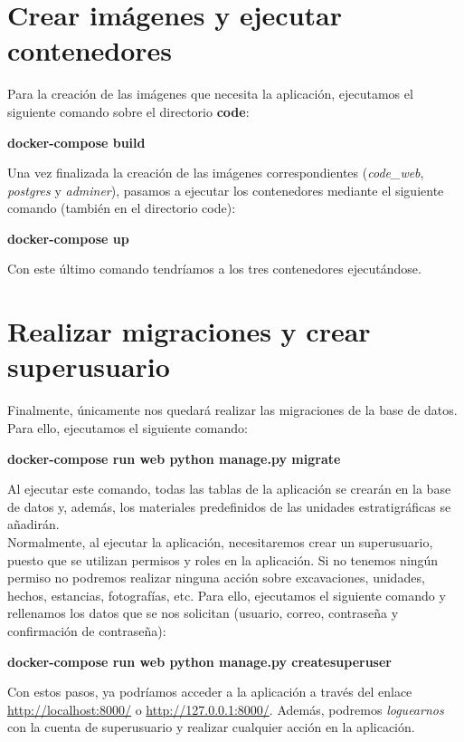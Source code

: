 \section{Crear imágenes y ejecutar contenedores}
Para la creación de las imágenes que necesita la aplicación, ejecutamos el siguiente comando
sobre el directorio \textbf{code}:

\begin{center}
    \textbf{docker-compose build}
\end{center}

Una vez finalizada la creación de las imágenes correspondientes (\textit{code\_web},
\textit{postgres} y \textit{adminer}), pasamos a ejecutar los contenedores mediante
el siguiente comando (también en el directorio code):

\begin{center}
    \textbf{docker-compose up}
\end{center}

Con este último comando tendríamos a los tres contenedores ejecutándose.

\section{Realizar migraciones y crear superusuario}
Finalmente, únicamente nos quedará realizar las migraciones de la base de datos. Para
ello, ejecutamos el siguiente comando:

\begin{center}
    \textbf{docker-compose run web python manage.py migrate}
\end{center}

Al ejecutar este comando, todas las tablas de la aplicación se crearán en la base de datos
y, además, los materiales predefinidos de las unidades estratigráficas se
añadirán. \\

Normalmente, al ejecutar la aplicación, necesitaremos crear un superusuario, puesto que se
utilizan permisos y roles en la aplicación. Si no tenemos ningún permiso no podremos
realizar ninguna acción sobre excavaciones, unidades, hechos, estancias, fotografías, etc.
Para ello, ejecutamos el siguiente comando y rellenamos los datos que se nos solicitan
(usuario, correo, contraseña y confirmación de contraseña):

\begin{center}
    \textbf{docker-compose run web python manage.py createsuperuser}
\end{center}

Con estos pasos, ya podríamos acceder a la aplicación a través del enlace
\url{http://localhost:8000/} o \url{http://127.0.0.1:8000/}. Además, podremos
\textit{loguearnos} con la cuenta de superusuario y realizar cualquier acción en la
aplicación.

